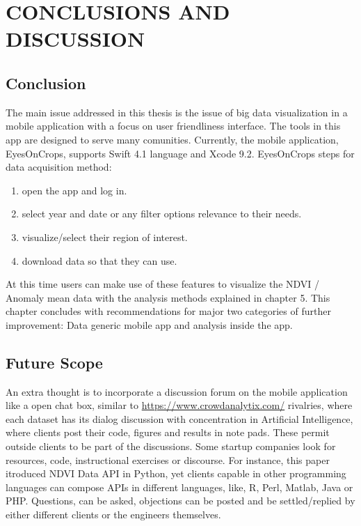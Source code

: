 \chapter{CONCLUSIONS AND DISCUSSION}
\label{chap:conclusion}

\section{Conclusion}

The main issue addressed in this thesis is the issue of big data visualization in a mobile application with a focus on user friendliness interface. The tools in this app are designed to serve many comunities. Currently, the mobile application, EyesOnCrops, supports Swift 4.1 language and Xcode 9.2. EyesOnCrops steps for data acquisition method:
\begin{enumerate}
  \item open the app and log in. 
  \item select year and date or any filter options relevance to their needs.
  \item visualize/select their region of interest.
  \item download data so that they can use.
\end{enumerate}

At this time users can make use of these features to visualize the NDVI / Anomaly mean data with the analysis methods explained in chapter 5. 
This chapter concludes with recommendations for major two
categories of further improvement: Data generic mobile app and analysis inside the app.

\section{Future Scope}

An extra thought is to incorporate a discussion forum on the mobile application like a open chat box, similar to  \url{https://www.crowdanalytix.com/} rivalries, where each dataset has its dialog discussion with concentration in Artificial Intelligence, where clients post their code, figures and results in note pads. These permit outside clients to be part of the discussions. Some startup companies look for resources, code, instructional exercises or discourse. For instance, this paper itroduced NDVI Data API in Python, yet clients capable in other programming languages can compose APIs in different languages, like, R, Perl, Matlab, Java or PHP. Questions, can be asked, objections can be posted and be settled/replied by either different clients or the engineers themselves. \\

